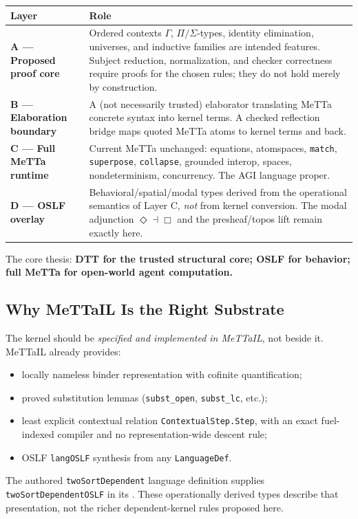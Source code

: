 \documentclass[11pt]{article}
\newcommand{\code}[1]{\texttt{#1}}
\newcommand{\codepath}[1]{\path{#1}}
\begin{document}
\medskip
\begin{tabular}{lp{9cm}}
\toprule
Layer & Role \\
\midrule
\textbf{A — Proposed proof core} &
  Ordered contexts $\Gamma$, $\Pi/\Sigma$-types, identity elimination,
  universes, and inductive families are intended features.
  Subject reduction, normalization, and checker correctness require proofs
  for the chosen rules; they do not hold merely by construction. \\[4pt]
\textbf{B — Elaboration boundary} &
  A (not necessarily trusted) elaborator translating MeTTa concrete syntax into
  kernel terms. A checked reflection bridge maps quoted MeTTa atoms to kernel
  terms and back. \\[4pt]
\textbf{C — Full MeTTa runtime} &
  Current MeTTa unchanged: equations, atomspaces, \code{match},
  \code{superpose}, \code{collapse}, grounded interop, spaces,
  nondeterminism, concurrency. The AGI language proper. \\[4pt]
\textbf{D — OSLF overlay} &
  Behavioral/spatial/modal types derived from the operational semantics of
  Layer C, \emph{not} from kernel conversion. The modal adjunction
  $\Diamond \dashv \Box$ and the presheaf/topos lift remain exactly here. \\
\bottomrule
\end{tabular}
\medskip

The core thesis: \textbf{DTT for the trusted structural core; OSLF for
behavior; full MeTTa for open-world agent computation.}

\subsection{Why MeTTaIL Is the Right Substrate}

The kernel should be \emph{specified and implemented in MeTTaIL}, not beside it.
MeTTaIL already provides:
\begin{itemize}
  \item locally nameless binder representation with cofinite quantification;
  \item proved substitution lemmas (\code{subst\_open}, \code{subst\_lc}, etc.);
  \item least explicit contextual relation \code{ContextualStep.Step}, with an
        exact fuel-indexed compiler and no representation-wide descent rule;
  \item OSLF \code{langOSLF} synthesis from any \code{LanguageDef}.
\end{itemize}
{\raggedright
The authored \code{twoSortDependent} language definition supplies
\code{twoSortDependentOSLF} in its \codepath{Pattern/Core.lean}.
These operationally derived types describe that presentation, not the richer
dependent-kernel rules proposed here.
\par}
\end{document}
